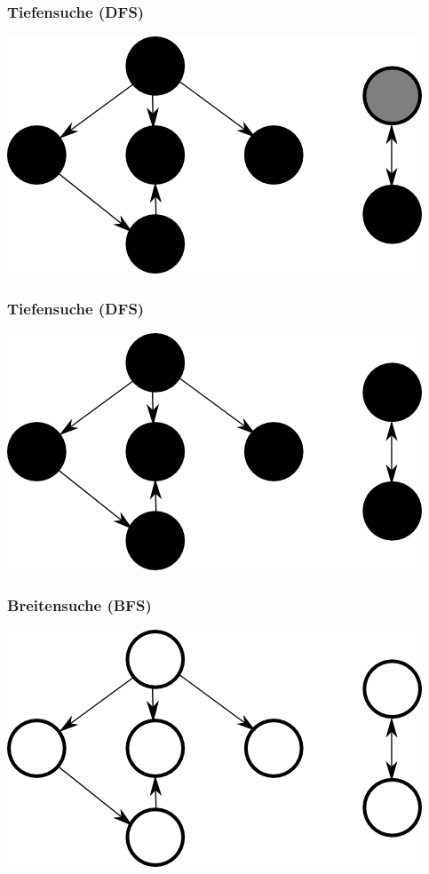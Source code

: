 \documentclass{beamer}
\begin{document}
\begin{frame}
\frametitle{Tiefensuche (DFS)}
\begin{center}
\includegraphics{dfs13}
\end{center}
\end{frame}


\begin{frame}
\frametitle{Tiefensuche (DFS)}
\begin{center}
\includegraphics{dfs14}
\end{center}
\end{frame}


\begin{frame}
\frametitle{Breitensuche (BFS)}
\includegraphics{search_start}
\end{frame}
\end{document}
